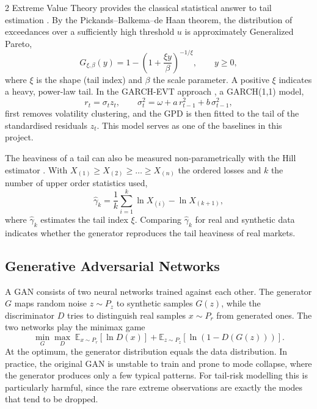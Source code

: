 \documentclass[12pt]{spieman}  %
\begin{document}
\begin{spacing}{2}
Extreme Value Theory provides the classical statistical answer to tail estimation \cite{Embrechts97}. By the Pickands--Balkema--de Haan theorem, the distribution of exceedances over a sufficiently high threshold $u$ is approximately Generalized Pareto,
\begin{equation}
G_{\xi,\beta}(y) = 1 - \left(1 + \frac{\xi y}{\beta}\right)^{-1/\xi}, \qquad y \ge 0,
\end{equation}
where $\xi$ is the shape (tail index) and $\beta$ the scale parameter. A positive $\xi$ indicates a heavy, power-law tail. In the GARCH-EVT approach \cite{McNeilFrey00}, a GARCH(1,1) model,
\begin{equation}
r_t = \sigma_t z_t, \qquad \sigma_t^2 = \omega + a\, r_{t-1}^2 + b\, \sigma_{t-1}^2,
\end{equation}
first removes volatility clustering, and the GPD is then fitted to the tail of the standardised residuals $z_t$. This model serves as one of the baselines in this project.

The heaviness of a tail can also be measured non-parametrically with the Hill estimator \cite{Hill75}. With $X_{(1)} \ge X_{(2)} \ge \dots \ge X_{(n)}$ the ordered losses and $k$ the number of upper order statistics used,
\begin{equation}
\hat{\gamma}_k = \frac{1}{k}\sum_{i=1}^{k} \ln X_{(i)} - \ln X_{(k+1)},
\end{equation}
where $\hat{\gamma}_k$ estimates the tail index $\xi$. Comparing $\hat{\gamma}_k$ for real and synthetic data indicates whether the generator reproduces the tail heaviness of real markets.

\subsection{Generative Adversarial Networks}

A GAN \cite{Goodfellow14} consists of two neural networks trained against each other. The generator $G$ maps random noise $z \sim P_z$ to synthetic samples $G(z)$, while the discriminator $D$ tries to distinguish real samples $x \sim P_r$ from generated ones. The two networks play the minimax game
\begin{equation}
\min_G \max_D \; \mathbb{E}_{x\sim P_r}[\ln D(x)] + \mathbb{E}_{z\sim P_z}[\ln(1 - D(G(z)))].
\end{equation}
At the optimum, the generator distribution equals the data distribution. In practice, the original GAN is unstable to train and prone to mode collapse, where the generator produces only a few typical patterns. For tail-risk modelling this is particularly harmful, since the rare extreme observations are exactly the modes that tend to be dropped.


\end{spacing}
\end{document}
